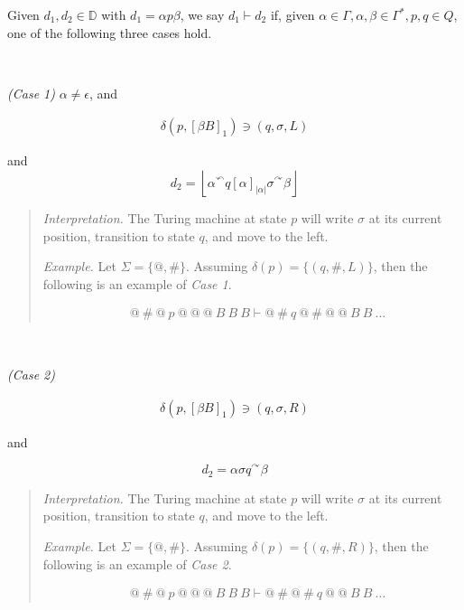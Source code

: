 \documentclass[a4paper, 12pt]{article}
\begin{document}
Given $d_1, d_2 \in \mathbb{D}$ with $d_1 = \alpha p \beta $, we say $d_1 \vdash
d_2$ if, given $\alpha \in \Gamma, \alpha, \beta \in  \Gamma^*, p, q \in Q$, one
of the following three cases hold.

~

\textit{(Case 1)} $\alpha \neq \epsilon$, and

\begin{align*}
    \delta \left( p, \left[ \beta B \right]_1  \right) \ni (q, \sigma, L)
\end{align*}

and 
$$d_2 = \left\lfloor \alpha {}^{\curvearrowleft} q [\alpha]_{|\alpha|} \sigma
{}^{\curvearrowright} \beta  \right\rfloor$$

\small 
\begin{quote}
    \textit{Interpretation.} The Turing machine at state $p$ will write $\sigma$
    at its current position, transition to state $q$, and move to the left. 

    \textit{Example.} Let $\Sigma = \{ @, \#\}$. Assuming $\delta (p) = \{ (q,
    \#, L) \}$, then the following is an example of
    \textit{Case 1}.
    
    \begin{align*}
        &@ ~ \# ~ @ ~ p ~ @ ~ @ ~ @ ~ B ~ B ~ B \vdash  @ ~ \# ~q ~ @ ~ \# ~ @ ~ @ ~ B ~ B
        ~ \ldots
    \end{align*}
\end{quote}
\normalsize 

~ 

\textit{(Case 2)} 

\begin{align*}
    \delta \left( p, \left[ \beta B \right]_1  \right) \ni (q, \sigma, R)
\end{align*}

and 

$$d_2 = \alpha \sigma q {}^{\curvearrowright} \beta $$

\small 
\begin{quote}
    \textit{Interpretation.} The Turing machine at state $p$ will write $\sigma$
    at its current position, transition to state $q$, and move to the left. 

    \textit{Example.} Let $\Sigma = \{ @, \#\}$. Assuming $\delta (p) = \{ (q,
    \#, R) \}$, then the following is an example of
    \textit{Case 2}.
    
    \begin{align*}
        &@ ~ \# ~ @ ~ p ~ @ ~ @ ~ @ ~ B ~ B ~ B \vdash  @ ~ \# ~@ ~ \# ~ q ~ @ ~
        @~ B ~ B
        ~ \ldots
    \end{align*}
\end{quote}
\normalsize 
\end{document}
